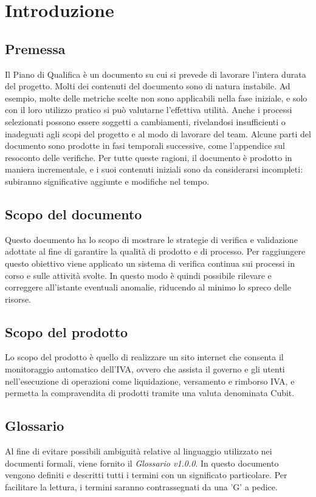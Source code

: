 \section{Introduzione}
\subsection{Premessa}
Il Piano di Qualifica è un documento su cui si prevede di lavorare l'intera durata del progetto.\newline 
Molti dei contenuti del documento sono di natura instabile. Ad esempio, molte delle metriche scelte non sono applicabili nella fase iniziale, e solo con il loro utilizzo pratico si può valutarne l'effettiva utilità. Anche i processi selezionati possono essere soggetti a cambiamenti, rivelandosi insufficienti o inadeguati agli scopi del progetto e al modo di lavorare del team.\newline 
Alcune parti del documento sono prodotte in fasi temporali successive, come l'appendice sul resoconto delle verifiche.\newline 
Per tutte queste ragioni, il documento è prodotto in maniera incrementale, e i suoi contenuti iniziali sono da considerarsi incompleti: subiranno significative aggiunte e modifiche nel tempo.
\subsection{Scopo del documento}
Questo documento ha lo scopo di mostrare le strategie di verifica e validazione adottate al fine di garantire la qualità di prodotto e di processo. Per raggiungere questo obiettivo viene applicato un sistema di verifica continua sui processi in corso e sulle attività svolte. In questo modo è quindi possibile rilevare e correggere all'istante eventuali anomalie, riducendo al minimo lo spreco delle risorse.
\subsection{Scopo del prodotto}
Lo scopo del prodotto è quello di realizzare un sito internet che consenta il monitoraggio automatico dell'IVA, ovvero che assista il governo e gli utenti nell'esecuzione di operazioni come liquidazione, versamento e rimborso IVA, e permetta la compravendita di prodotti tramite una valuta denominata Cubit\glo.
\subsection{Glossario}
Al fine di evitare possibili ambiguità relative al linguaggio utilizzato nei documenti formali, viene fornito il \textit{Glossario v1.0.0}. In questo documento vengono definiti e descritti tutti i termini con un significato particolare. Per facilitare la lettura, i termini saranno contrassegnati da una 'G' a pedice.
